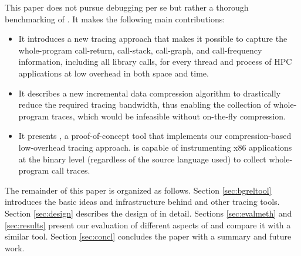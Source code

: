 %
This paper does not pursue debugging per se but rather a thorough benchmarking of \parlot. It makes the following main contributions:
%

\begin{itemize}
\item It introduces a new tracing approach that makes it possible to capture the whole-program call-return, call-stack, call-graph, and call-frequency information, including all library calls, for every thread and process of HPC applications at low overhead in both space and time.
\item It describes a new incremental data compression algorithm to drastically reduce the required tracing bandwidth, thus enabling the collection of whole-program traces, which would be infeasible without on-the-fly compression.
\item It presents \parlot, a proof-of-concept tool that implements our compression-based low-overhead tracing approach. \parlot is capable of instrumenting x86 applications at the binary level (regardless of the source language used) to collect whole-program call traces.
\end{itemize}
%
The remainder of this paper is organized as follows. Section \ref{sec:bgreltool} introduces the basic ideas and infrastructure behind \parlot and other tracing tools. Section \ref{sec:design} describes the design of \parlot in detail. Sections \ref{sec:evalmeth} and \ref{sec:results} present our evaluation of different aspects of \parlot and compare it with a similar tool. Section \ref{sec:concl}
concludes the paper with a summary and future work.




